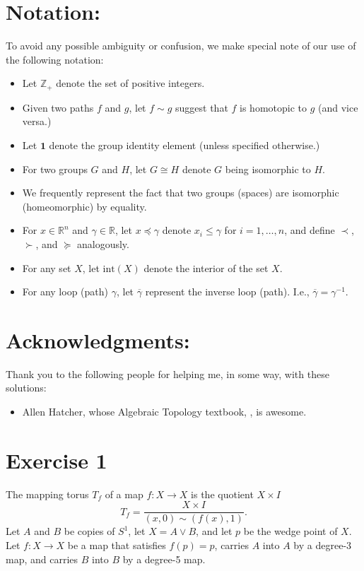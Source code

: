 \documentclass[twoside, titlepage]{amsart}
\theoremstyle{plain} %
\theoremstyle{definition}
\theoremstyle{remark}
\theoremstyle{notation}
\newcommand{\interior}[1]{\text{int}(#1)}
\newcommand{\inv}[1]{\overline{#1}}
\begin{document}
	\section*{Notation:}
	To avoid any possible ambiguity or confusion, we make special note of our use of the following notation:
	\begin{itemize}
		\item Let $\mathbb{Z}_+$ denote the set of positive integers.
		\item Given two paths $f$ and $g$, let $f \sim g$ suggest that $f$ is homotopic to $g$ (and vice versa.)
		\item Let $\textbf{1}$ denote the group identity element (unless specified otherwise.)
		\item For two groups $G$ and $H$, let $G \cong H$ denote $G$ being isomorphic to $H$.
		\item We frequently represent the fact that two groups (spaces) are isomorphic (homeomorphic) by equality.
		\item For $x \in \mathbb{R}^n$ and $\gamma \in \mathbb{R}$, let $x \preceq \gamma$ denote $x_i \leq \gamma$ for $i = 1, \dots, n$, and define $\prec$, $\succ$, and $\succeq$ analogously.
		\item For any set $X$, let $\interior{X}$ denote the interior of the set $X$.
		\item For any loop (path) $\gamma$, let $\inv{\gamma}$ represent the inverse loop (path).  I.e., $\inv{\gamma} = \gamma^{-1}$.
	\end{itemize}
	
	\section*{Acknowledgments:}
	Thank you to the following people for helping me, in some way, with these solutions:
	\begin{itemize}
		\item Allen Hatcher, whose Algebraic Topology textbook, \cite{hatcher01}, is awesome.
	\end{itemize}

	\clearpage
	
	\section*{Exercise 1}
	
	The mapping torus $T_f$ of a map $f: X \to X$ is the quotient $X \times I$
	$$T_f = \frac{X \times I}{(x,0) \sim (f(x),1)}.$$
	Let $A$ and $B$ be copies of $S^1$, let $X = A \vee B$, and let $p$ be the wedge point of $X$.  Let $f: X \to X$ be a map that satisfies $f(p) = p$, carries $A$ into $A$ by a degree-3 map, and carries $B$ into $B$ by a degree-5 map.
	
\end{document}
